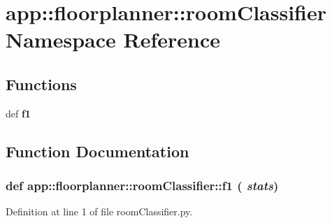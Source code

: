 \section{app::floorplanner::roomClassifier Namespace Reference}
\label{namespaceapp_1_1floorplanner_1_1roomClassifier}


\subsection*{Functions}
\begin{CompactItemize}
\item 
def {\bf f1}
\end{CompactItemize}


\subsection{Function Documentation}
\subsubsection{\setlength{\rightskip}{0pt plus 5cm}def app::floorplanner::roomClassifier::f1 ( {\em stats})}\label{namespaceapp_1_1floorplanner_1_1roomClassifier_8f93d7a21473035b86795f261812c9c3}




Definition at line 1 of file roomClassifier.py.